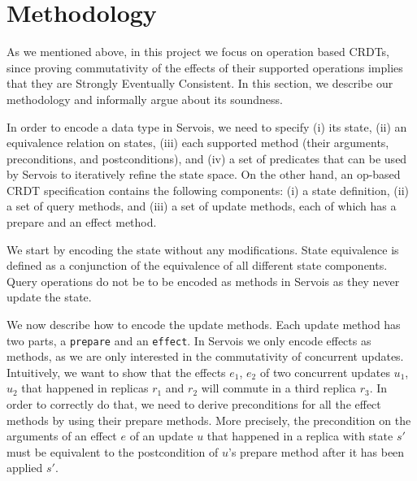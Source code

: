 \documentclass{article}
\newcommand{\TODO}[1]{\hl{\textbf{TODO:} #1}\xspace}
\begin{document}
\section{Methodology}

As we mentioned above, in this project we focus on operation based
CRDTs, since proving commutativity of the effects of their supported
operations implies that they are Strongly Eventually Consistent. In
this section, we describe our methodology and informally argue about
its soundness.

In order to encode a data type in Servois, we need to specify (i) its
state, (ii) an equivalence relation on states, (iii) each supported
method (their arguments, preconditions, and postconditions), and (iv)
a set of predicates that can be used by Servois to iteratively refine
the state space. On the other hand, an op-based CRDT specification
contains the following components: (i) a state definition, (ii) a set
of query methods, and (iii) a set of update methods, each of which has
a prepare and an effect method.

We start by encoding the state without any modifications. State
equivalence is defined as a conjunction of the equivalence of all
different state components. Query operations do not be to be encoded
as methods in Servois as they never update the state.

We now describe how to encode the update methods. Each update method
has two parts, a \texttt{prepare} and an \texttt{effect}. In Servois
we only encode effects as methods, as we are only interested in the
commutativity of concurrent updates.
Intuitively, we want to show that the effects $e_1$, $e_2$ of two
concurrent updates $u_1$, $u_2$ that happened in replicas $r_1$ and
$r_2$ will commute in a third replica $r_3$. In order to correctly do
that, we need to derive preconditions for all the effect methods by
using their prepare methods. More precisely, the precondition on the
arguments of an effect $e$ of an update $u$ that happened in a replica
with state $s'$ must be equivalent to the postcondition of $u$'s
prepare method after it has been applied $s'$.
\end{document}
